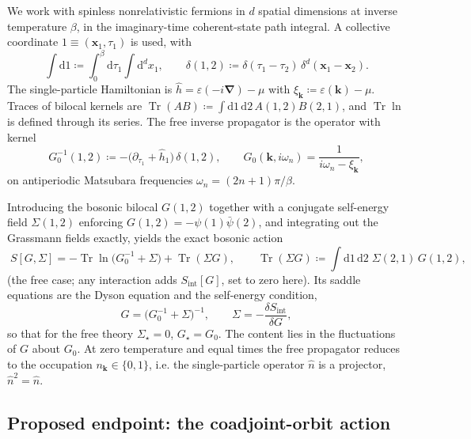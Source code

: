 \documentclass[11pt]{article}
\theoremstyle{remark}
\begin{document}
We work with spinless nonrelativistic fermions in $d$ spatial dimensions at inverse
temperature $\beta$, in the imaginary-time coherent-state path integral. A collective
coordinate $1\equiv(\boldsymbol{x}_1,\tau_1)$ is used, with
\[
\int \mathrm{d}1 \coloneqq \int_0^\beta \mathrm{d}\tau_1\int \mathrm{d}^d x_1,
\qquad
\delta(1,2)\coloneqq \delta(\tau_1-\tau_2)\,\delta^d(\boldsymbol{x}_1-\boldsymbol{x}_2).
\]
The single-particle Hamiltonian is $\hat h=\varepsilon(-i\boldsymbol{\nabla})-\mu$ with
$\xi_{\boldsymbol{k}}\coloneqq\varepsilon(\boldsymbol{k})-\mu$. Traces of bilocal kernels
are $\operatorname{Tr}(AB)\coloneqq\int\mathrm{d}1\,\mathrm{d}2\,A(1,2)B(2,1)$, and
$\operatorname{Tr}\ln$ is defined through its series. The free inverse propagator is the
operator with kernel
\[
G_0^{-1}(1,2)\coloneqq-\big(\partial_{\tau_1}+\hat h_1\big)\,\delta(1,2),
\qquad
G_0(\boldsymbol{k},i\omega_n)=\frac{1}{i\omega_n-\xi_{\boldsymbol{k}}},
\]
on antiperiodic Matsubara frequencies $\omega_n=(2n+1)\pi/\beta$.

Introducing the bosonic bilocal $G(1,2)$ together with a conjugate self-energy field
$\Sigma(1,2)$ enforcing $G(1,2)=-\psi(1)\bar\psi(2)$, and integrating out the Grassmann
fields exactly, yields the exact bosonic action
\begin{equation}
\label{eq:start}
\boxed{\;
S[G,\Sigma]=-\operatorname{Tr}\ln\!\big(G_0^{-1}+\Sigma\big)+\operatorname{Tr}(\Sigma G),
\qquad
\operatorname{Tr}(\Sigma G)\coloneqq\int\mathrm{d}1\,\mathrm{d}2\;\Sigma(2,1)\,G(1,2),\;}
\end{equation}
(the free case; any interaction adds $S_{\mathrm{int}}[G]$, set to zero here). Its
saddle equations are the Dyson equation and the self-energy condition,
\[
G=\big(G_0^{-1}+\Sigma\big)^{-1},
\qquad
\Sigma=-\frac{\delta S_{\mathrm{int}}}{\delta G},
\]
so that for the free theory $\Sigma_\star=0$, $G_\star=G_0$. The content lies in the
fluctuations of $G$ about $G_0$. At zero temperature and equal times the free propagator
reduces to the occupation $n_{\boldsymbol{k}}\in\{0,1\}$, i.e. the single-particle operator
$\hat n$ is a projector, $\hat n^2=\hat n$.

\subsection{Proposed endpoint: the coadjoint-orbit action}
\end{document}
